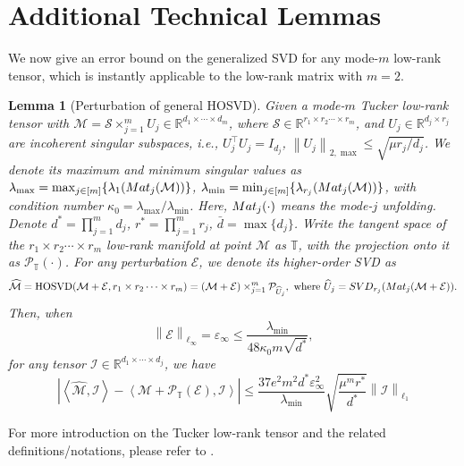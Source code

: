 \documentclass[12pt]{article}
\newcommand{\SVD}{{\rm SVD}}
\newcommand{\Mat}{{\rm Mat}}
\newcommand{\abs}[1]{\left\lvert#1\right\rvert}
\newcommand{\norm}[1]{\left\lVert#1\right\rVert}
\newcommand{\R}{\mathbb{R}}
\newcommand{\cE}{\mathcal{E}}
\newcommand{\cP}{\mathcal{P}}
\newcommand{\cM}{\mathcal{M}}
\newcommand{\cI}{\mathcal{I}}
\newcommand{\cS}{\mathcal{S}}
\def\TT{{\mathbb T}}
\newcommand{\dmax}{\bar{d}}
\newtheorem{Lemma}{Lemma}
\theoremstyle{plain}
\begin{document}
\section{Additional Technical Lemmas}
We now give an error bound on the generalized SVD for any mode-$m$ low-rank tensor, which is instantly applicable to the low-rank matrix with $m=2$.
\begin{Lemma}[Perturbation of general HOSVD] \label{eq:lemma:tensor-diff} Given a mode-$m$ Tucker low-rank tensor with $\cM=\cS\times_{j=1}^m U_j\in \R^{d_1\times\cdots\times d_m}$, where  $\cS\in\R^{ r_1\times r_2\cdots\times r_m}$, and  $U_j\in\R^{d_j\times r_j}$ are incoherent singular subspaces, i.e., $U_j^\top U_j=I_{d_j}$, $\norm{U_j}_{2,\max}\le\sqrt{\mu r_j/d_j}$. We denote its  maximum and minimum singular values as $\lambda_{\max}=\max_{j\in [m]}\{ \lambda_{1}( \Mat_j(\cM) ) \}$, $\lambda_{\min}=\min_{j\in [m]}\{ \lambda_{r_j}( \Mat_j(\cM) ) \}$, with condition number $\kappa_0=\lambda_{\max}/\lambda_{\min}$. Here, $\Mat_j(\cdot)$ means the mode-$j$ unfolding. Denote $d^*=\prod_{j=1}^m d_j$, $r^*=\prod_{j=1}^m r_j$, $\dmax=\max\{d_j\}$. Write the tangent space of the $r_1\times r_2\cdots\times r_m$ low-rank manifold at point $\cM$  as $\TT$, with the projection onto it as $\cP_{\TT}(\cdot)$. For any perturbation $\cE$, we denote its higher-order SVD as 
$$\widehat{\cM}=\operatorname{HOSVD}(\cM+\cE,r_1\times r_2\cdots\times r_m)= (\cM+\cE) \times_{j=1}^m \cP_{\widehat{U}_j}, \text{ where } \widehat{U}_j=\SVD_{r_j}(\Mat_j(\cM+\cE)).
$$
 Then,  when 
 $$\norm{\cE}_{\ell_{\infty}}= \varepsilon_{\infty} \le \frac{\lambda_{\min}}{48\kappa_0 m\sqrt{d^*}}, 
 $$
 for any tensor $\cI\in \R^{d_1\times\cdots\times d_j}$, we have
\begin{equation*}
    \abs{\left\langle \widehat{\cM},\cI \right\rangle-\left\langle\cM +\cP_{\TT}(\cE),\cI \right\rangle} \le \frac{37e^2 m^2 d^*\varepsilon_{\infty}^2}{\lambda_{\min} }\sqrt{\frac{\mu^m r^*}{d^*} }\norm{\cI}_{\ell_1}
\end{equation*}
\end{Lemma}
For more introduction on the Tucker low-rank tensor and the related definitions/notations, please refer to \cite{ma2024statistical}.
\end{document}
